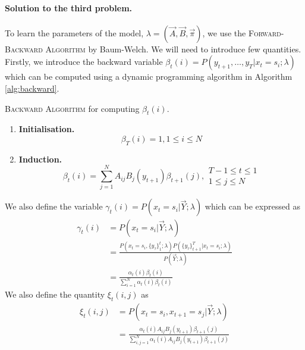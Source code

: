 \paragraph{Solution to the third problem.}
	To learn the parameters of the model, $\lambda = \left( \vec A, \vec B, \vec \pi \right)$, we use the \textsc{Forward-Backward Algorithm} by Baum-Welch. We will need to introduce few quantities. Firstly, we introduce the backward variable $\beta_t(i) = P\left( y_{t + 1}, \dotsc, y_T | x_t = s_i; \lambda \right)$ which can be computed using a dynamic programming algorithm in Algorithm \ref{alg:backward}.
	\begin{algorithm}
		\caption{\textsc{Backward Algorithm} for computing $\beta_t(i)$.}
		\label{alg:backward}
		\begin{enumerate}
			\item
				\textbf{Initialisation.}
				$$\beta_T(i) = 1, 1 \leq i \leq N$$
			\item
				\textbf{Induction.}
				\begin{equation*}
					\beta_t(i) = \sum_{j = 1}^N A_{ij} B_j(y_{t + 1}) \beta_{t + 1}(j), 
					\begin{array}{lr}
						T - 1 \leq t \leq 1\\
						1 \leq j \leq N
					\end{array}
				\end{equation*}
		\end{enumerate}
	\end{algorithm}
We also define the variable $\gamma_t(i) = P\left( x_t = s_i | \vec Y; \lambda \right)$ which can be expressed as
	\begin{align}
		\gamma_t(i) 	& = P\left( x_t = s_i | \vec Y; \lambda \right) \nonumber\\
				& = \frac{ P\left( x_t = s_i, \{ y_\tau \}_1^t; \lambda \right)  P\left( \{ y_\tau \}_{t + 1}^T | x_t = s_i; \lambda \right)}{ P\left( \vec Y; \lambda \right)} \nonumber\\
				& = \frac{\alpha_t(i) \beta_t(i)}{\sum_{i = 1}^N \alpha_t(i) \beta_t(i)} \label{eqn:hmmGamma}
	\end{align}
We also define the quantity $\xi_t(i, j)$ as
	\begin{align}
		\xi_t(i, j) 	& = P\left(x_t = s_i, x_{t + 1} = s_j | \vec Y; \lambda \right) \nonumber\\
				& = \frac{\alpha_t(i) A_{ij} B_j(y_{t + 1}) \beta_{t + 1}(j)}{\sum_{i, j = 1}^N \alpha_t(i) A_{ij} B_j(y_{t + 1}) \beta_{t + 1}(j)}
	\end{align}
